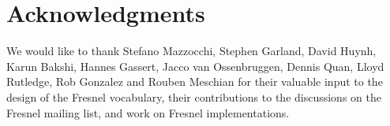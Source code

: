 \documentclass{llncs}
\begin{document}










\section*{Acknowledgments}
\vspace{-0.5em}

{\footnotesize We would like to thank Stefano Mazzocchi, Stephen Garland, David Huynh, Karun Bakshi, Hannes Gassert, Jacco van Ossenbruggen, Dennis Quan, Lloyd Rutledge, Rob Gonzalez and Rouben Meschian for their valuable input to the design of the Fresnel vocabulary, their contributions to the discussions on the Fresnel mailing list, and work on Fresnel implementations.}



\end{document}
